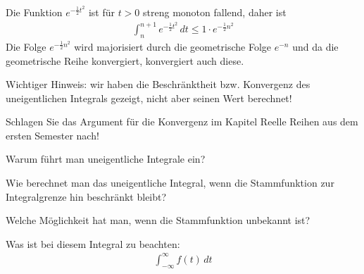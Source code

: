 \begin{frame}
    Die Funktion $e^{-\frac12 t^2}$ ist für $t>0$ streng monoton fallend, daher ist
    \begin{gather*}
        \int_{n}^{n+1} e^{-\frac12 t^2}\,dt \le 1\cdot e^{-\frac12 n^2}
    \end{gather*}
    Die Folge $e^{-\frac12 n^2}$ wird majorisiert durch die geometrische Folge $e^{-n}$ und da die geometrische Reihe konvergiert, konvergiert auch diese.

    Wichtiger Hinweis: wir haben die Beschränktheit bzw. Konvergenz des uneigentlichen Integrals gezeigt, nicht aber seinen Wert berechnet! 

    \begin{Wdh}
        Schlagen Sie das Argument für die Konvergenz im Kapitel \glqq{}Reelle Reihen\grqq{} aus dem ersten Semester nach!
    \end{Wdh}
\end{frame}

\begin{Abschluss}
\item Warum führt man uneigentliche Integrale ein?
\item Wie berechnet man das uneigentliche Integral, wenn die Stammfunktion zur Integralgrenze hin beschränkt bleibt?
\item Welche Möglichkeit hat man, wenn die Stammfunktion unbekannt ist?
\item Was ist bei diesem Integral zu beachten:
  \begin{gather*}
    \int_{-\infty}^\infty f(t)\,dt
  \end{gather*}
\end{Abschluss}

